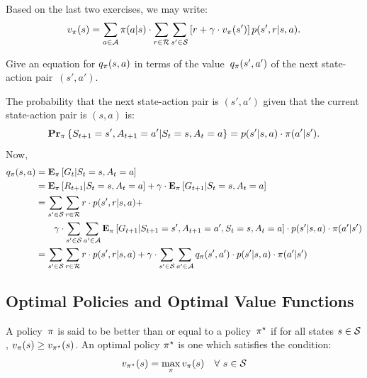 Based on the last two exercises, we may write:
\begin{equation}
    v_{\pi} (s) = \sum_{a \in \mathcal{A}} \pi (a \vert s) \cdot 
            \sum_{r \in \mathcal{R}} \sum_{s' \in \mathcal{S}} \left [ r + \gamma \cdot v_{\pi}(s') \right ] p(s', r \vert s, a).
\end{equation}

\begin{exer}
Give an equation for $q_{\pi} (s, a)$ in terms of the 
value~$q_{\pi} (s', a')$ of the next state-action pair~$(s', a')$. 
\end{exer}
\begin{solution}
The probability that the next state-action pair is $(s', a')$ given 
that the current state-action pair is $(s, a)$ is:
\[
    \mathbf{Pr}_{\pi} \left \{ S_{t + 1} = s', A_{t + 1} = a' \vert S_t = s, A_t = a \right \}
    = p(s' \vert s, a) \cdot \pi (a' \vert s').
\]
Now,
\begin{align*}
    q_{\pi} (s, a) & = \mathbf{E}_{\pi} \left [ G_t \vert S_t = s, A_t = a \right ] \\
                       & = \mathbf{E}_{\pi} \left [ R_{t + 1} \vert S_t = s, A_t = a \right ] + 
                           \gamma \cdot \mathbf{E}_{\pi} \left [ G_{t + 1} \vert S_t = s, A_t = a \right ] \\
                       & = \sum_{s' \in \mathcal{S}} \sum_{r \in \mathcal{R}} r \cdot p(s', r \vert s, a) + \\
                       & \quad \quad \gamma \cdot \sum_{s' \in \mathcal{S}} \sum_{a' \in \mathcal{A}} 
                            \mathbf{E}_{\pi} \left [ G_{t + 1} \vert S_{t + 1} = s', A_{t + 1} = a', S_t = s, A_t = a \right ] \cdot 
                            p(s' \vert s, a) \cdot \pi (a' \vert s')\\
                       & = \sum_{s' \in \mathcal{S}} \sum_{r \in \mathcal{R}} r \cdot p(s', r \vert s, a) + \gamma \cdot 
                           \sum_{s' \in \mathcal{S}} \sum_{a' \in \mathcal{A}} q_{\pi} (s', a') \cdot p(s' \vert s, a) \cdot \pi (a' \vert s')
\end{align*}
\end{solution}

\subsection{Optimal Policies and Optimal Value Functions}

A policy~$\pi$ is said to be better than or equal to a policy~$\pi^{\star}$
if for all states $s \in \mathcal{S}$, $v_{\pi}(s) \geq v_{\pi^{\star}}(s)$. 
An optimal policy $\pi^{\star}$ is one which satisfies the condition:
\begin{equation}
    v_{\pi^{\star}} (s) = \max_{\pi} v_{\pi} (s) \quad \forall \ s \in \mathcal{S}
\end{equation}
